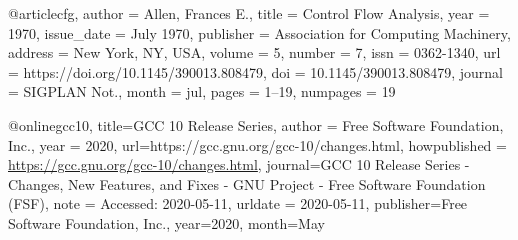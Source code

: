 @article{cfg, author = {Allen, Frances E.},
title = {Control Flow Analysis},
year = {1970},
issue_date = {July 1970},
publisher = {Association for Computing Machinery},
address = {New York, NY, USA},
volume = {5},
number = {7},
issn = {0362-1340},
url = {https://doi.org/10.1145/390013.808479},
doi = {10.1145/390013.808479},
journal = {SIGPLAN Not.},
month = jul,
pages = {1–19},
numpages = {19} 
}

@online{gcc10, 
title={GCC 10 Release Series}, 
author = {Free Software Foundation, Inc.},
year = 2020,
url={https://gcc.gnu.org/gcc-10/changes.html}, 
howpublished = {\url{https://gcc.gnu.org/gcc-10/changes.html}},
journal={GCC 10 Release Series - Changes, New Features, and Fixes - GNU Project - Free Software Foundation (FSF)}, 
note = {Accessed: 2020-05-11},
urldate = {2020-05-11},
publisher={Free Software Foundation, Inc.}, 
year={2020}, month={May}}